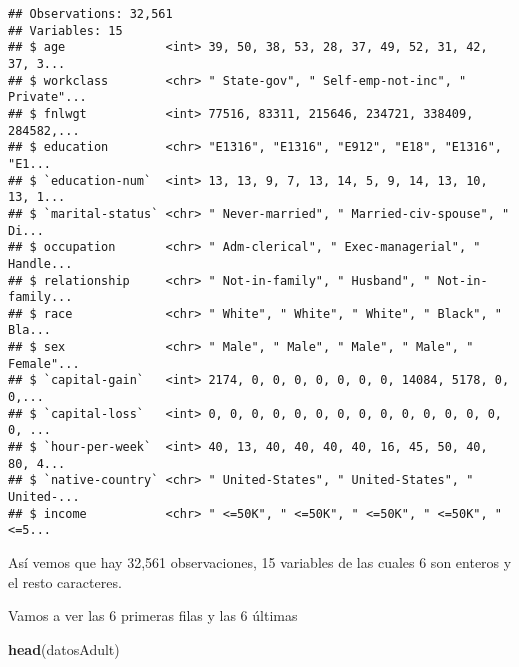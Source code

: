 \documentclass[]{article}
\newenvironment{Shaded}{\begin{snugshade}}{\end{snugshade}}
\newcommand{\KeywordTok}[1]{\textcolor[rgb]{0.13,0.29,0.53}{\textbf{#1}}}
\newcommand{\NormalTok}[1]{#1}
\begin{document}
\begin{verbatim}
## Observations: 32,561
## Variables: 15
## $ age              <int> 39, 50, 38, 53, 28, 37, 49, 52, 31, 42, 37, 3...
## $ workclass        <chr> " State-gov", " Self-emp-not-inc", " Private"...
## $ fnlwgt           <int> 77516, 83311, 215646, 234721, 338409, 284582,...
## $ education        <chr> "E1316", "E1316", "E912", "E18", "E1316", "E1...
## $ `education-num`  <int> 13, 13, 9, 7, 13, 14, 5, 9, 14, 13, 10, 13, 1...
## $ `marital-status` <chr> " Never-married", " Married-civ-spouse", " Di...
## $ occupation       <chr> " Adm-clerical", " Exec-managerial", " Handle...
## $ relationship     <chr> " Not-in-family", " Husband", " Not-in-family...
## $ race             <chr> " White", " White", " White", " Black", " Bla...
## $ sex              <chr> " Male", " Male", " Male", " Male", " Female"...
## $ `capital-gain`   <int> 2174, 0, 0, 0, 0, 0, 0, 0, 14084, 5178, 0, 0,...
## $ `capital-loss`   <int> 0, 0, 0, 0, 0, 0, 0, 0, 0, 0, 0, 0, 0, 0, 0, ...
## $ `hour-per-week`  <int> 40, 13, 40, 40, 40, 40, 16, 45, 50, 40, 80, 4...
## $ `native-country` <chr> " United-States", " United-States", " United-...
## $ income           <chr> " <=50K", " <=50K", " <=50K", " <=50K", " <=5...
\end{verbatim}

Así vemos que hay 32,561 observaciones, 15 variables de las cuales 6 son
enteros y el resto caracteres.

Vamos a ver las 6 primeras filas y las 6 últimas

\begin{Shaded}
\begin{Highlighting}[]
\KeywordTok{head}\NormalTok{(datosAdult)}
\end{Highlighting}
\end{Shaded}
\end{document}
